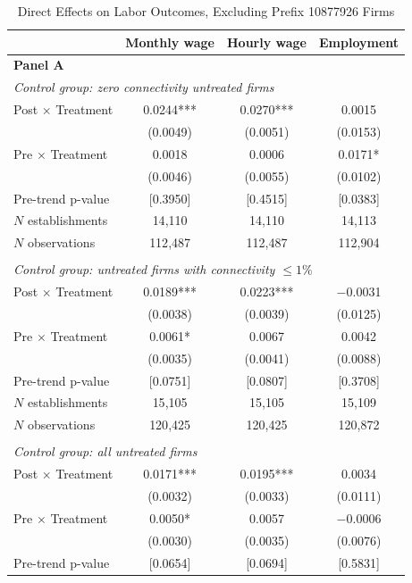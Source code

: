 \begin{table}[!htbp]
\centering
\caption{Direct Effects on Labor Outcomes, Excluding Prefix 10877926 Firms}
\label{tab:labor_prefix_direct}
\scriptsize
\begin{tabular}{lccc}
\toprule
 & Monthly wage & Hourly wage & Employment \\
\midrule
\multicolumn{4}{l}{\textbf{Panel A}}\\
\multicolumn{4}{l}{\textit{Control group: zero connectivity untreated firms}}\\
Post $\times$ Treatment & 0.0244*** & 0.0270*** & 0.0015\\
 & (0.0049) & (0.0051) & (0.0153)\\
Pre $\times$ Treatment & 0.0018 & 0.0006 & 0.0171*\\
 & (0.0046) & (0.0055) & (0.0102)\\
Pre-trend p-value & [0.3950] & [0.4515] & [0.0383]\\
$N$ establishments & 14{,}110 & 14{,}110 & 14{,}113\\
$N$ observations & 112{,}487 & 112{,}487 & 112{,}904\\
\addlinespace
\multicolumn{4}{l}{\textbf{Panel B}}\\
\multicolumn{4}{l}{\textit{Control group: untreated firms with connectivity $\leq 1\%$}}\\
Post $\times$ Treatment & 0.0189*** & 0.0223*** & $-$0.0031\\
 & (0.0038) & (0.0039) & (0.0125)\\
Pre $\times$ Treatment & 0.0061* & 0.0067 & 0.0042\\
 & (0.0035) & (0.0041) & (0.0088)\\
Pre-trend p-value & [0.0751] & [0.0807] & [0.3708]\\
$N$ establishments & 15{,}105 & 15{,}105 & 15{,}109\\
$N$ observations & 120{,}425 & 120{,}425 & 120{,}872\\
\addlinespace
\multicolumn{4}{l}{\textbf{Panel C}}\\
\multicolumn{4}{l}{\textit{Control group: all untreated firms}}\\
Post $\times$ Treatment & 0.0171*** & 0.0195*** & 0.0034\\
 & (0.0032) & (0.0033) & (0.0111)\\
Pre $\times$ Treatment & 0.0050* & 0.0057 & $-$0.0006\\
 & (0.0030) & (0.0035) & (0.0076)\\
Pre-trend p-value & [0.0654] & [0.0694] & [0.5831]\\

\end{tabular}
\end{table}
